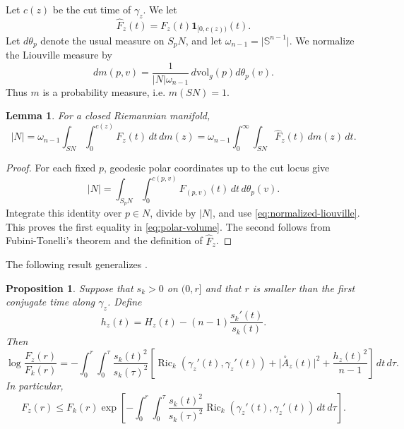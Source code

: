 \documentclass[11pt, reqno]{amsart}
\newtheorem{lemma}{Lemma}
\newtheorem{proposition}{Proposition}
\begin{document}
Let $c(z)$ be the cut time of $\gamma_z$. We let
$$\widehat F_z(t)=F_z(t)\mathbf 1_{[0, c(z))}(t). $$
Let $d\theta_p$ denote the usual measure on $S_pN$, and let $\omega_{n-1}=\lvert\mathbb S^{n-1}\rvert$. We normalize the Liouville measure by
\begin{equation}\label{eq:normalized-liouville}
dm(p, v)=\frac{1}{\lvert N\rvert\omega_{n-1}}\, d\mathrm{vol}_g(p)d\theta_p(v).
\end{equation}
Thus $m$ is a probability measure, i.e. $m(SN)=1$.
\begin{lemma}\label{lem:polar-volume}
For a closed Riemannian manifold,
\begin{equation}\label{eq:polar-volume}
\lvert N\rvert
=\omega_{n-1}\int_{SN}\int_0^{c(z)}F_z(t)\, dt\, dm(z)
=\omega_{n-1}\int_0^\infty\int_{SN}\widehat F_z(t)\, dm(z)\, dt.
\end{equation}
\end{lemma}

\begin{proof}
For each fixed $p$, geodesic polar coordinates up to the cut locus give
$$
\lvert N\rvert
=\int_{S_pN}\int_0^{c(p, v)}F_{(p, v)}(t)\, dt\, d\theta_p(v).
$$
Integrate this identity over $p\in N$, divide by $\lvert N\rvert$, and use \eqref{eq:normalized-liouville}. This proves the first equality in \eqref{eq:polar-volume}. The second follows from Fubini-Tonelli's theorem and the definition of $\widehat F_z$.
\end{proof}
The following result generalizes \cite[Proposition 2.1]{Kwong2025}.
\begin{proposition}\label{prop:fixed-model}
Suppose that $s_k>0$ on $(0, r]$ and that $r$ is smaller than the first conjugate time along $\gamma_z$. Define
$$h_z(t)=H_z(t)-(n-1)\frac{s_k'(t)}{s_k(t)}. $$
Then
\begin{equation} \label{eq:exact-fixed}
\log\frac{F_z(r)}{F_k(r)}
=-\int_0^r\int_0^\tau \frac{s_k(t)^2}{s_k(\tau)^2} \left[\operatorname{Ric}_k(\gamma_z'(t), \gamma_z'(t)) +\lvert\stackrel\circ{A}_z(t)\rvert^2 +\frac{h_z(t)^2}{n-1} \right] \, dt\, d\tau.
\end{equation}
In particular,
\begin{equation}\label{eq:kwong-jacobian}
F_z(r)\le F_k(r) \exp\left[-\int_0^r\int_0^\tau \frac{s_k(t)^2}{s_k(\tau)^2} \operatorname{Ric}_k(\gamma_z'(t), \gamma_z'(t)) \, dt\, d\tau\right].
\end{equation}
\end{proposition}
\end{document}

